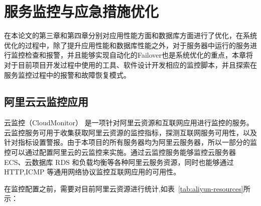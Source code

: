 \chapter{服务监控与应急措施优化}
在本论文的第三章和第四章分别对应用性能方面和数据库方面进行了优化，在系统优化的过程中，除了提升应用性能和数据库性能之外，对于服务器中运行的服务进行监控检查和报警，并且能够实现自动化的Failover也是系统优化的重点，本章将对于目前项目开发过程中使用的工具、软件设计开发相应的监控脚本，并且探索在服务监控过程中的报警和故障恢复模式\cite{刘雄辉2007服务器监控管理}。
\label{cha:Monitor}
\section{阿里云云监控应用}
云监控（CloudMonitor） 是一项针对阿里云资源和互联网应用进行监控的服务。云监控服务可用于收集获取阿里云资源的监控指标，探测互联网服务可用性，以及针对指标设置警报。由于本项目的所有服务器均为阿里云服务器，所以一部分的监控可以通过配置阿里云的云监控来实施。通过云监控服务能够监控云服务器 ECS、云数据库 RDS 和负载均衡等各种阿里云服务资源，同时也能够通过 HTTP,ICMP 等通用网络协议监控互联网应用的可用性。

在监控配置之前，需要对目前阿里云资源进行统计,如表~\ref{tab:aliyun-resources}所示：

